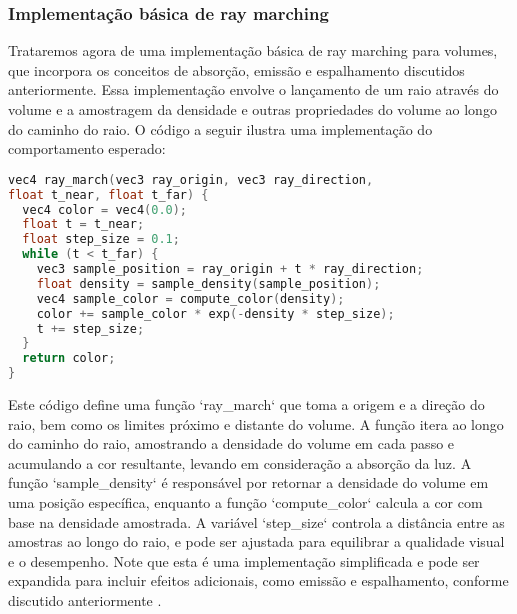 \subsubsection{Implementação básica de ray marching}
Trataremos agora de uma implementação básica de ray marching para volumes, que incorpora os conceitos de absorção, emissão e espalhamento discutidos anteriormente. 
Essa implementação envolve o lançamento de um raio através do volume e a amostragem da densidade e outras propriedades do volume ao longo do caminho do raio. O código a seguir ilustra uma implementação do comportamento esperado:

\begin{lstlisting}[language=C]
vec4 ray_march(vec3 ray_origin, vec3 ray_direction,
float t_near, float t_far) {
  vec4 color = vec4(0.0);
  float t = t_near;
  float step_size = 0.1;
  while (t < t_far) {
    vec3 sample_position = ray_origin + t * ray_direction;
    float density = sample_density(sample_position);
    vec4 sample_color = compute_color(density);
    color += sample_color * exp(-density * step_size);
    t += step_size;
  }
  return color;
}
\end{lstlisting}

Este código define uma função `ray\_march` que toma a origem e a direção do raio, bem como os limites próximo e distante do volume. A função itera ao longo do caminho do raio, amostrando a densidade do volume em cada passo e acumulando a cor resultante, levando em consideração a absorção da luz. A função `sample\_density` é responsável por retornar a densidade do volume em uma posição específica, enquanto a função `compute\_color` calcula a cor com base na densidade amostrada. A variável `step\_size` controla a distância entre as amostras ao longo do raio, e pode ser ajustada para equilibrar a qualidade visual e o desempenho. Note que esta é uma implementação simplificada e pode ser expandida para incluir efeitos adicionais, como emissão e espalhamento, conforme discutido anteriormente \cite{Pharr2016}.